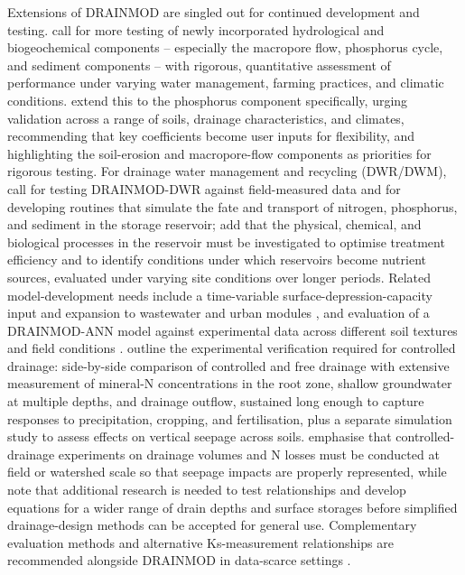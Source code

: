 Extensions of DRAINMOD are singled out for continued development and testing.
\textcite{Askar2021b} call for more testing of newly incorporated hydrological
and biogeochemical components -- especially the macropore flow, phosphorus cycle,
and sediment components -- with rigorous, quantitative assessment of performance
under varying water management, farming practices, and climatic conditions.
\textcite{Askar2025} extend this to the phosphorus component specifically, urging
validation across a range of soils, drainage characteristics, and climates,
recommending that key coefficients become user inputs for flexibility, and
highlighting the soil-erosion and macropore-flow components as priorities for
rigorous testing. For drainage water management and recycling (DWR/DWM),
\textcite{Moursi2022} call for testing DRAINMOD-DWR against field-measured data
and for developing routines that simulate the fate and transport of nitrogen,
phosphorus, and sediment in the storage reservoir; \textcite{Moursi2023} add that
the physical, chemical, and biological processes in the reservoir must be
investigated to optimise treatment efficiency and to identify conditions under
which reservoirs become nutrient sources, evaluated under varying site conditions
over longer periods. Related model-development needs include a time-variable
surface-depression-capacity input and expansion to wastewater and urban modules
\parencite{Abduljaleel2023}, and evaluation of a DRAINMOD-ANN model against
experimental data across different soil textures and field conditions
\parencite{Awad2022}. \textcite{Youssef2018} outline the experimental verification
required for controlled drainage: side-by-side comparison of controlled and free
drainage with extensive measurement of mineral-N concentrations in the root zone,
shallow groundwater at multiple depths, and drainage outflow, sustained long
enough to capture responses to precipitation, cropping, and fertilisation, plus a
separate simulation study to assess effects on vertical seepage across soils.
\textcite{Skaggs2010} emphasise that controlled-drainage experiments on drainage
volumes and N losses must be conducted at field or watershed scale so that
seepage impacts are properly represented, while \textcite{Skaggs2006} note that
additional research is needed to test relationships and develop equations for a
wider range of drain depths and surface storages before simplified drainage-design
methods can be accepted for general use. Complementary evaluation methods and
alternative Ks-measurement relationships are recommended alongside DRAINMOD in
data-scarce settings \parencite{NabiSichani2012}.

